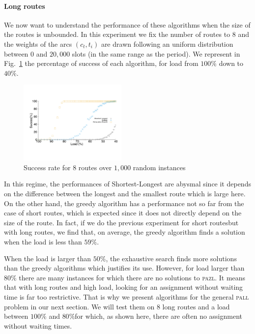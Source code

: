 \documentclass[10pt, conference, letterpaper]{IEEEtran}
\newcommand\pazl{\textsc{pazl}\xspace}
\newcommand\pall{\textsc{pall}\xspace}
\providecommand{\DIFaddtex}[1]{{\protect\color{blue}\uwave{#1}}} %
\providecommand{\DIFaddbegin}{} %
\providecommand{\DIFaddend}{} %
\providecommand{\DIFadd}[1]{\texorpdfstring{\DIFaddtex{#1}}{#1}} %
\newcommand{\DIFaddincludegraphics}[2][]{{\color{blue}\fbox{\DIFOincludegraphics[#1]{#2}}}} %
\DeclareRobustCommand{\DIFaddbegin}{\DIFOaddbegin \let\includegraphics\DIFaddincludegraphics} %
\DeclareRobustCommand{\DIFaddend}{\DIFOaddend \let\includegraphics\DIFOincludegraphics} %
\begin{document}
        \paragraph{Long routes}

      We now want to understand the performance of these algorithms when the size of the routes is unbounded. In this experiment we fix the number of routes to $8$ and the weights of the arcs $(c_t,t_i)$ are drawn following an uniform distribution between $0$ and $20,000$ slots (in the same range as the period). We represent in Fig.~\ref{fig:long} the percentage of success of each algorithm, for load from $100\%$ down to $40\%$.

\begin{figure}[h]

       \begin{center}
      \includegraphics[width=0.47\textwidth]{echec_longues.pdf}
      \end{center}

      \caption{Success rate for $8$ routes over $1,000$ random instances}\label{fig:long}
     \end{figure}

      In this regime, the performances of Shortest-Longest are abysmal since it depends on the difference between the longest and the smallest route which is large here. On the other hand, the greedy algorithm has a performance not so far from the case of short routes, which is expected since it does not directly depend on the size of the route. In fact, if we do the previous experiment  \DIFaddbegin \DIFadd{(}\DIFaddend for short routes\DIFaddbegin \DIFadd{) }\DIFaddend but with long routes, we find that, on average, the greedy algorithm finds a solution when the load is less than $59\%$.

      When the load is larger than $50\%$, the exhaustive search finds more solutions than the greedy algorithms which justifies its use. However, for load larger than $80\%$ there are many instances for which there are no solutions to \pazl.
      It means that with long routes and high load, looking for an assignment without waiting time is far too restrictive. That is why we present algorithms for the general \pall problem in our next section. We will test them on $8$ long routes and a load between $100\%$ and $80\%$\DIFaddbegin \DIFadd{, parameters }\DIFaddend for which, as shown here, there are often no assignment without waiting times.
\end{document}

